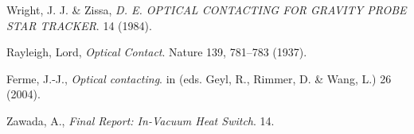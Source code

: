 \documentclass[colorlinks=true,pdfstartview=FitV,linkcolor=blue,
            citecolor=red,urlcolor=magenta]{ligodoc}
\begin{document}
\begin{thebibliography}{9}
	  Wright, J. J. & Zissa,
	  \emph{D. E. OPTICAL CONTACTING FOR GRAVITY PROBE STAR TRACKER}.
	  14 (1984).    
      
	  Rayleigh, Lord,
	  \emph{Optical Contact}.
	  Nature 139, 781–783 (1937).
	  
	  Ferme, J.-J.,
	  \emph{Optical contacting}.
	  in (eds. Geyl, R., Rimmer, D. & Wang, L.) 26 (2004).
	 
	  Zawada, A.,
	  \emph{Final Report: In-Vacuum Heat Switch}.
	  14.
 
\end{thebibliography} %
\end{document}
